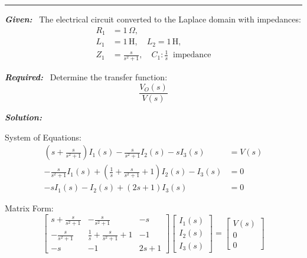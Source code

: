 \documentclass[11pt]{article}
\begin{document}
\noindent\rule{\textwidth}{1pt}
\vspace{12pt}

\noindent\textbf{\textit{Given:}}  
\ The electrical circuit converted to the Laplace domain with impedances:
\[
\begin{aligned}
R_1 &= 1\, \Omega, \\
L_1 &= 1\, \text{H}, \quad L_2 = 1\, \text{H},  \\
Z_1 &= \frac{s}{s^2 + 1}, \quad C_1: \frac{1}{s} \ \text{ impedance}
\end{aligned}
\]


\vspace{12pt}


\noindent\textbf{\textit{Required:}}
    \ Determine the transfer function:
    \[
    \frac{V_O(s)}{V(s)}
    \]
    
\vspace{12pt}

\noindent \textbf{\textit{Solution:}}

\vspace{12pt}

{System of Equations:}
\[
\begin{aligned}
\left(s + \frac{s}{s^2 + 1}\right) I_1(s) - \frac{s}{s^2 + 1} I_2(s) - s I_3(s) &= V(s) \\
- \frac{s}{s^2 + 1} I_1(s) + \left( \frac{1}{s} + \frac{s}{s^2 + 1} + 1 \right) I_2(s) - I_3(s) &= 0 \\
- s I_1(s) - I_2(s) + (2s + 1) I_3(s) &= 0
\end{aligned}
\]

\bigskip

Matrix Form:
\begingroup
\renewcommand{\arraystretch}{1.5}
\[
\begin{bmatrix}
\displaystyle s + \frac{s}{s^2 + 1} & \displaystyle - \frac{s}{s^2 + 1} & -s \\
\displaystyle - \frac{s}{s^2 + 1} & \displaystyle \frac{1}{s} + \frac{s}{s^2 + 1} + 1 & -1 \\
-s & -1 & 2s + 1
\end{bmatrix}
\begin{bmatrix}
I_1(s) \\ I_2(s) \\ I_3(s)
\end{bmatrix}
=
\begin{bmatrix}
V(s) \\ 0 \\ 0
\end{bmatrix}
\]
\endgroup
\end{document}
